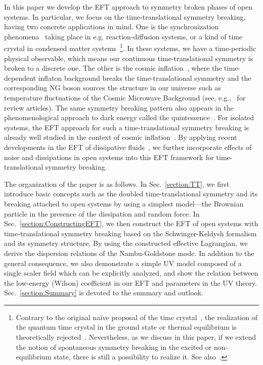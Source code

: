 \documentclass[a4paper,11pt]{article}
\begin{document}
\medskip
In this paper we develop the EFT approach to symmetry broken phases of open systems. 
In particular, we focus on the time-translational symmetry breaking, 
having two concrete applications in mind. 
One is the synchronization phenomena~\cite{Kuramoto,MoriKuramoto} 
taking place in e.g. reaction-diffusion systems, or a kind of time crystal 
in condensed matter systems~\cite{PhysRevLett.96.230602,PhysRevLett.99.140402,sieberer2016keldysh}\footnote{
Contrary to the original na\"ive proposal of the time crystal~\cite{Wilczek:2012jt}, 
the realization of the quantum time crystal in the ground state or 
thermal equilibrium is theoretically rejected~\cite{Bruno:2013mva,Watanabe:2014hea,Yamamoto:2015fxa}.
Nevertheless, as we discuss in this paper, if we extend the notion of 
spontaneous symmetry breaking in the excited or non-equilibrium state, 
there is still a possibility to realize it.
See also~\cite{Buca:2018ccq}.
}.
In these systems, we have a time-periodic physical observable, 
which means our continuous time-translational symmetry is broken to 
a discrete one. 
The other is the cosmic inflation~\cite{Starobinsky:1980te,Guth:1980zm,Sato:1980yn}, 
where the time-dependent inflaton background breaks the time-translational 
symmetry and the corresponding NG boson sources the structure 
in our universe 
such as temperature fluctuations of the 
Cosmic Microwave Background (see, e.g.,~\cite{Baumann:2009ds,Senatore:2016aui} for review articles).
The same symmetry breaking pattern also appears in the phenomenological 
approach to dark energy called the quintessence~\cite{Gubitosi:2012hu}.
For isolated systems, the EFT approach for such a time-translational symmetry breaking is already well studied in the context of cosmic inflation~\cite{Cheung:2007st}. By applying recent developments in the EFT of dissipative fluids~\cite{Crossley:2015evo,Glorioso:2017fpd}, we further incorporate effects of noise and dissipations in open systems into this EFT framework for time-translational symmetry breaking.


\medskip
The organization of the paper is as follows. 
In Sec.~\ref{section:TT},
we first introduce basic concepts such as the doubled time-translational symmetry
and its breaking attached to open systems by using a simplest model---the Brownian particle in the presence of the dissipation and random force. 
In Sec.~\ref{section:ConstructingEFT}, we then construct 
the EFT of open systems with time-translational symmetry breaking 
based on the Schwinger-Keldysh formalism and its symmetry structure.
By using the constructed effective Lagrangian, 
we derive the dispersion relations of the Nambu-Goldstone mode.
In addition to the general consequence, 
we also demonstrate a simple UV model composed of 
a single scaler field which can be explicitly analyzed, 
and show the relation between the low-energy (Wilson) coefficient in our EFT  
and parameters in the UV theory.
Sec.~\ref{section:Summary} is devoted to the summary and outlook.
\end{document}
